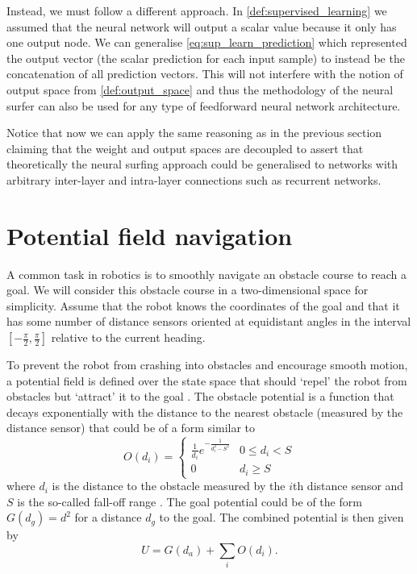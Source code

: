 Instead, we must follow a different approach. 
In \ref{def:supervised_learning} we assumed that the neural network will output a scalar value because it only has one output node. 
We can generalise \ref{eq:sup_learn_prediction} which represented the output vector (the scalar prediction for each input sample) to instead be the concatenation of all prediction vectors.
This will not interfere with the notion of output space from \ref{def:output_space} and thus the methodology of the neural surfer can also be used for any type of feedforward neural network architecture.

Notice that now we can apply the same reasoning as in the previous section claiming that the weight and output spaces are decoupled to assert that theoretically the neural surfing approach could be generalised to networks with arbitrary inter-layer and intra-layer connections such as recurrent networks.

\section{Potential field navigation}
A common task in robotics is to smoothly navigate an obstacle course to reach a goal.
We will consider this obstacle course in a two-dimensional space for simplicity.
Assume that the robot knows the coordinates of the goal and that it has some number of distance sensors oriented at equidistant angles in the interval $[-\frac{\pi}{2},\frac{\pi}{2}]$ relative to the current heading.

To prevent the robot from crashing into obstacles and encourage smooth motion, a potential field is defined over the state space that should `repel' the robot from obstacles but `attract' it to the goal \cite[999--1000]{russell2010}.
The obstacle potential is a function that decays exponentially with the distance to the nearest obstacle (measured by the distance sensor) that could be of a form similar to
\begin{equation}
    O(d_i) = 
    \begin{cases} 
        \frac{1}{d_i} e^{-\frac{1}{d_i^2-S^2}} & 0 \leq d_i < S  \\
        0 & d_i \geq S
   \end{cases}
\end{equation}
where $d_i$ is the distance to the obstacle measured by the $i$th distance sensor and $S$ is the so-called fall-off range \cite{weir2006}.
The goal potential could be of the form
$G(d_g)=d^2$
for a distance $d_g$ to the goal. The combined potential is then given by
\begin{equation}
    \label{eq:combined_potential}
    U = G(d_a) + \sum_i{O(d_i)}.
\end{equation}


